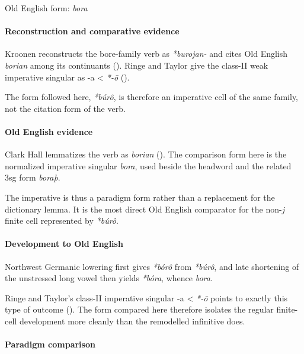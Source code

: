 \documentclass[
  british,
  a4paper,
]{article}
\begin{document}
Old English form: \emph{bora}

\paragraph{Reconstruction and comparative
evidence}\label{reconstruction-and-comparative-evidence-59}

Kroonen reconstructs the bore-family verb as \emph{*burojan-} and cites
Old English \emph{borian} among its continuants
(). Ringe and Taylor give
the class-II weak imperative singular as -a \textless{} \emph{*-ō}
().

The form followed here, \emph{*búrô}, is therefore an imperative cell of
the same family, not the citation form of the verb.

\paragraph{Old English evidence}\label{old-english-evidence-59}

Clark Hall lemmatizes the verb as \emph{borian}
(). The comparison form
here is the normalized imperative singular \emph{bora}, used beside the
headword and the related 3sg form \emph{boraþ}.

The imperative is thus a paradigm form rather than a replacement for the
dictionary lemma. It is the most direct Old English comparator for the
non-\emph{j} finite cell represented by \emph{*búrô}.

\paragraph{Development to Old
English}\label{development-to-old-english-59}

Northwest Germanic lowering first gives \emph{*bórô} from \emph{*búrô},
and late shortening of the unstressed long vowel then yields
\emph{*bóra}, whence \emph{bora}.

Ringe and Taylor's class-II imperative singular -a \textless{}
\emph{*-ō} points to exactly this type of outcome
(). The form
compared here therefore isolates the regular finite-cell development
more cleanly than the remodelled infinitive does.

\paragraph{Paradigm comparison}\label{paradigm-comparison-20}
\end{document}
